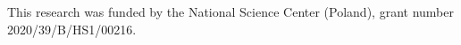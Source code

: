 \documentclass[a4paper,12pt]{amsart}
\numberwithin{equation}{section}
\theoremstyle{mytheoremstyle}
\begin{document}
\begin{sloppypar}
This research was funded by the National Science Center (Poland), grant
number 2020/39/B/HS1/00216.
\end{sloppypar}


\end{document}
